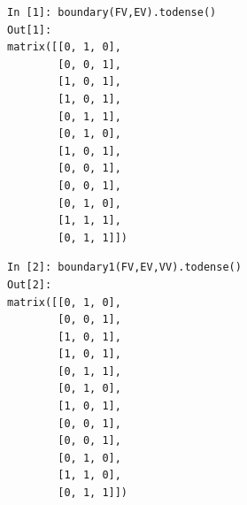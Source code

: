 \documentclass[11pt,oneside]{article}	%
\begin{document}
{\scriptsize
\begin{minipage}[c]{0.5\linewidth}
\centering
\begin{verbatim}
In [1]: boundary(FV,EV).todense()
Out[1]: 
matrix([[0, 1, 0],
        [0, 0, 1],
        [1, 0, 1],
        [1, 0, 1],
        [0, 1, 1],
        [0, 1, 0],
        [1, 0, 1],
        [0, 0, 1],
        [0, 0, 1],
        [0, 1, 0],
        [1, 1, 1],
        [0, 1, 1]])
\end{verbatim}
\end{minipage}
\begin{minipage}[c]{0.5\linewidth}
\centering
\begin{verbatim}
In [2]: boundary1(FV,EV,VV).todense()
Out[2]: 
matrix([[0, 1, 0],
        [0, 0, 1],
        [1, 0, 1],
        [1, 0, 1],
        [0, 1, 1],
        [0, 1, 0],
        [1, 0, 1],
        [0, 0, 1],
        [0, 0, 1],
        [0, 1, 0],
        [1, 1, 0],
        [0, 1, 1]])
\end{verbatim}
\end{minipage}}
\end{document}
